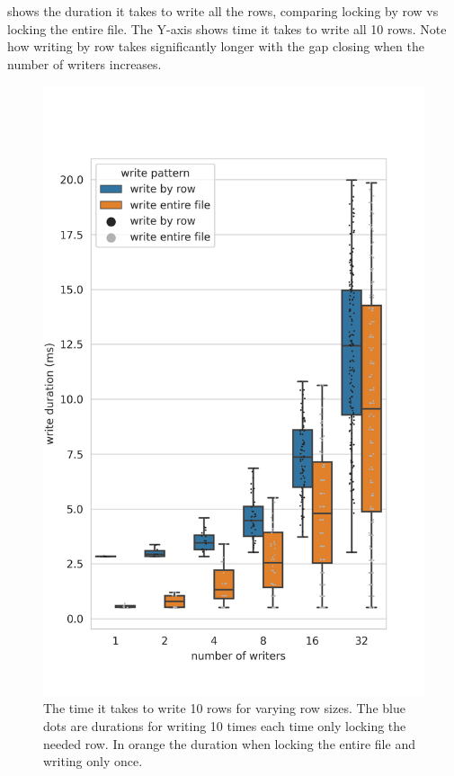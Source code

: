 %
 shows the duration it takes to write all the rows, comparing locking by row vs locking the entire file. The Y-axis shows time it takes to write all 10 rows. Note how writing by row takes significantly longer with the gap closing when the number of writers increases.
%
\begin{figure}[htbp]
	\centering
	\includegraphics[height=\textheight]{../results/plots/range_vs_writers_both.png}
	\caption{The time it takes to write 10 rows for varying row sizes. The blue dots are durations for writing 10 times each time only locking the needed row. In orange the duration when locking the entire file and writing only once.}
	\label{fig:writers}
\end{figure}

\clearpage

